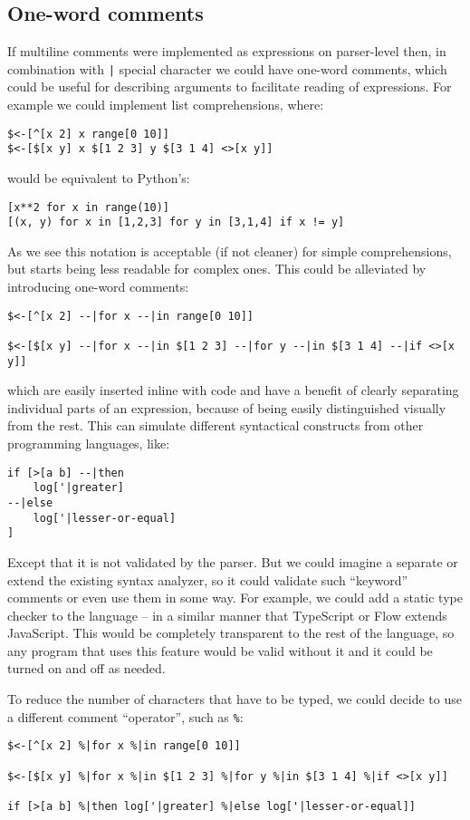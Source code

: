 \subsection{One-word comments}
If multiline comments were implemented as expressions on parser-level then, in
combination with \texttt{|} special character we could have one-word comments,
which could be useful for describing arguments to facilitate reading of
expressions. For example we could implement list comprehensions, where:
\begin{lstlisting}
$<-[^[x 2] x range[0 10]]
$<-[$[x y] x $[1 2 3] y $[3 1 4] <>[x y]]
\end{lstlisting}
would be equivalent to
Python's\cite[Section~5.1.3]{python_tutorial}:
\begin{lstlisting}
[x**2 for x in range(10)]
[(x, y) for x in [1,2,3] for y in [3,1,4] if x != y]
\end{lstlisting}
As we see this notation is acceptable (if not cleaner) for simple
comprehensions, but starts being less readable for complex ones. This could be
alleviated by introducing one-word comments:
\begin{lstlisting}
$<-[^[x 2] --|for x --|in range[0 10]]

$<-[$[x y] --|for x --|in $[1 2 3] --|for y --|in $[3 1 4] --|if <>[x y]]
\end{lstlisting}
which are easily inserted inline with code and have a benefit of clearly
separating individual parts of an expression, because of being easily
distinguished visually from the rest. This can simulate different syntactical
constructs from other programming languages, like:
\begin{lstlisting}
if [>[a b] --|then
    log['|greater]
--|else
    log['|lesser-or-equal]
]
\end{lstlisting}
Except that it is not validated by the parser. But we could imagine a separate
or extend the existing syntax analyzer, so it could validate such ``keyword''
comments or even use them in some way. For example, we could add a static type
checker to the language -- in a similar manner that TypeScript or
Flow\cite{flow_site} extends JavaScript. This would be
completely transparent to the rest of the language, so any program that uses
this feature would be valid without it and it could be turned on and off as
needed.

To reduce the number of characters that have to be typed, we could decide to use
a different comment ``operator'', such as \texttt{\%}:
\begin{lstlisting}
$<-[^[x 2] %|for x %|in range[0 10]]

$<-[$[x y] %|for x %|in $[1 2 3] %|for y %|in $[3 1 4] %|if <>[x y]]

if [>[a b] %|then log['|greater] %|else log['|lesser-or-equal]]
\end{lstlisting}

